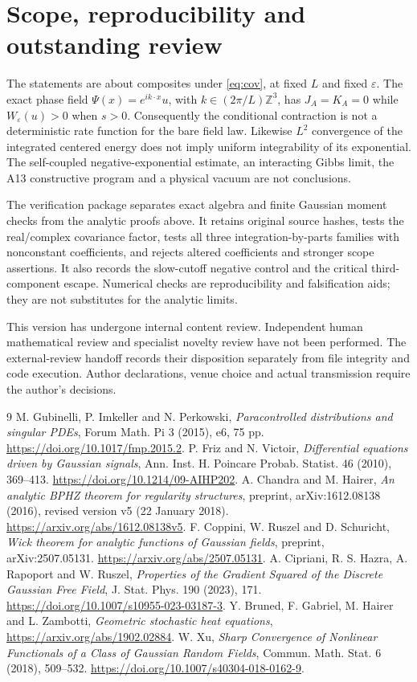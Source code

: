 \documentclass[11pt]{article}
\newcommand{\eps}{\varepsilon}
\begin{document}
\section{Scope, reproducibility and outstanding review}
The statements are about composites under \eqref{eq:cov}, at fixed $L$ and
fixed $\eps$. The exact phase field $\Psi(x)=e^{ik\cdot x}u$, with
$k\in(2\pi/L)\mathbb Z^3$, has
$J_A=K_A=0$ while $W_\eps(u)>0$ when $s>0$.
Consequently the conditional contraction is not a deterministic rate
function for the bare field law. Likewise $L^2$ convergence of the integrated
centered energy does not imply uniform integrability of its exponential.
The self-coupled negative-exponential estimate, an interacting Gibbs limit,
the A13 constructive program and a physical vacuum are not conclusions.

The verification package separates exact algebra and finite Gaussian moment
checks from the analytic proofs above. It retains original source hashes,
tests the real/complex covariance factor, tests all three integration-by-parts
families with nonconstant coefficients, and rejects altered coefficients and
stronger scope assertions. It also records the slow-cutoff negative control
and the critical third-component escape. Numerical checks are reproducibility
and falsification aids; they are not substitutes for the analytic limits.

This version has undergone internal content review. Independent human
mathematical review and specialist novelty review have not been performed.
The external-review handoff records their disposition separately from file
integrity and code execution. Author declarations, venue choice and actual
transmission require the author's decisions.

\begin{thebibliography}{9}
\footnotesize
\setlength{\itemsep}{2pt}
 M. Gubinelli, P. Imkeller and N. Perkowski,
\emph{Paracontrolled distributions and singular PDEs}, Forum Math. Pi
3 (2015), e6, 75 pp. \url{https://doi.org/10.1017/fmp.2015.2}.
 P. Friz and N. Victoir,
\emph{Differential equations driven by Gaussian signals}, Ann. Inst. H.
Poincare Probab. Statist. 46 (2010), 369--413.
\url{https://doi.org/10.1214/09-AIHP202}.
 A. Chandra and M. Hairer,
\emph{An analytic BPHZ theorem for regularity structures}, preprint,
arXiv:1612.08138 (2016), revised version v5 (22 January 2018).
\url{https://arxiv.org/abs/1612.08138v5}.
 F. Coppini, W. Ruszel and D. Schuricht,
\emph{Wick theorem for analytic functions of Gaussian fields}, preprint,
arXiv:2507.05131. \url{https://arxiv.org/abs/2507.05131}.
 A. Cipriani, R. S. Hazra, A. Rapoport and W. Ruszel,
\emph{Properties of the Gradient Squared of the Discrete Gaussian Free Field},
J. Stat. Phys. 190 (2023), 171.
\url{https://doi.org/10.1007/s10955-023-03187-3}.
 Y. Bruned, F. Gabriel, M. Hairer and L. Zambotti,
\emph{Geometric stochastic heat equations},
\url{https://arxiv.org/abs/1902.02884}.
 W. Xu,
\emph{Sharp Convergence of Nonlinear Functionals of a Class of Gaussian Random Fields},
Commun. Math. Stat. 6 (2018), 509--532.
\url{https://doi.org/10.1007/s40304-018-0162-9}.
\end{thebibliography}
\end{document}
